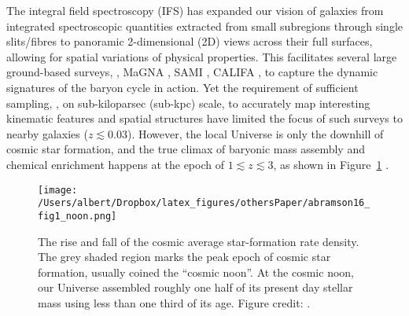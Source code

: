 The integral field spectroscopy (IFS) has expanded our vision of galaxies from integrated spectroscopic
quantities extracted from small subregions through single slits/fibres to panoramic 2-dimensional (2D) views
across their full surfaces, allowing for spatial variations of physical properties.  This facilitates several
large ground-based surveys, \eg, MaGNA \citep{Bundy:2015ft,Law:2015hc}, SAMI
\citep{TheSAMIGalaxySurv:wpN2l47X,Medling:2018hx}, CALIFA \citep{Sanchez:2016cs}, to capture the dynamic
signatures of the baryon cycle in action.
Yet the requirement of sufficient sampling, \ie, on sub-kiloparsec (sub-kpc) scale, to accurately map interesting
kinematic features and spatial structures have limited the focus of such surveys to nearby galaxies
($z\lesssim0.03$).  However, the local Universe is only the downhill of cosmic star formation, and the true
climax of baryonic mass assembly and chemical enrichment happens at the epoch of $1\lesssim z\lesssim3$, as shown
in Figure~\ref{fig:cosmic_noon} \citep[see \eg, ][and references there in]{2014ARA&A..52..415M,Abramson:2016wf}.
\begin{figure}
    \centering
    \texttt{[image: /Users/albert/Dropbox/latex\_figures/othersPaper/abramson16\_fig1\_noon.png]}
    \caption[The rise and fall of the cosmic average star-formation rate density.]{The rise and fall of the
    cosmic average star-formation rate density.
    The grey shaded region marks the peak epoch of cosmic star formation, usually coined the ``cosmic noon''.
    At the cosmic noon, our Universe assembled roughly one half of its present day stellar mass using less than one third of its age.
    Figure credit: \citet{Abramson:2016wf}.
    \label{fig:cosmic_noon}}
\end{figure}

